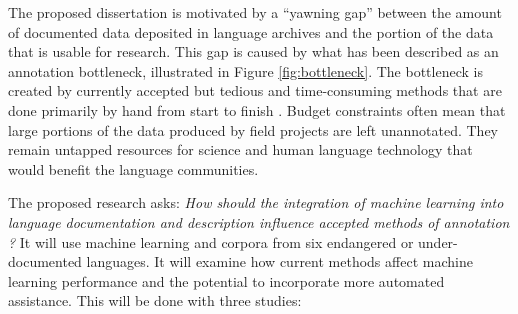 The proposed dissertation is motivated by a “yawning gap” \cite{seifart_language_2018} between the amount of documented data deposited in language archives and the portion of the data that is usable for research. This gap is caused by what has been described as an annotation bottleneck, illustrated in Figure \ref{fig:bottleneck}. The bottleneck is created by currently accepted but tedious and time-consuming methods that are done primarily by hand from start to finish \cite{simons_worlds_2013,holton_developing_2017}. 
Budget constraints often mean that large portions of the data produced by field projects are left unannotated. They remain untapped resources for science and human language technology that would benefit the language communities. 

The proposed research asks: \emph{How should the integration of machine learning into language documentation and description influence accepted methods of annotation%
?} It will use machine learning and corpora from six endangered or under-documented languages. It will 
examine how current methods affect machine learning performance and the potential to incorporate more automated assistance. This will be done with three studies:

